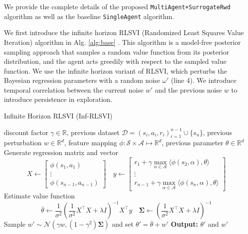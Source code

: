 We provide the complete details of the proposed \texttt{MultiAgent+SurrogateRwd} algorithm as well as the baseline \texttt{SingleAgent} algorithm.

We first introduce the infinite horizon RLSVI (Randomized Least Squares Value Iteration) algorithm in Alg. \ref{alg:base} \cite{russo2018tutorial}. This algorithm is a model-free posterior sampling approach that samples a random value function from its posterior distribution, and the agent acts greedily with respect to the sampled value function. We use the infinite horizon variant of RLSVI, which perturbs the Bayesian regression parameters with a random noise $\omega'$ (line 4). We introduce temporal correlation between the current noise $w'$ and the previous noise $w$ to introduce persistence in exploration.

\begin{algorithm}[H]
    \caption{Infinite Horizon RLSVI (Inf-RLSVI)}
        \begin{algorithmic}[1]
             discount factor $\gamma \in \mathbb{R}$, previous dataset $\mathcal{D} = (s_i, a_i, r_i)_{i = 1}^{n-1} \cup \{s_{n}\}$, previous perturbation $w \in \mathbb{R}^d$, feature mapping $\phi: \mathcal{S} \times \mathcal{A} \mapsto \mathbb{R}^d$, previous parameter $\theta \in \mathbb{R}^{d}$
            \STATE Generate regression matrix and vector
            $$
                X \leftarrow\left[\begin{array}{c}
                \phi\left(s_1, a_1\right) \\
                \vdots \\
                \phi\left(s_{n-1}, a_{n-1}\right)
                \end{array}\right] \quad y \leftarrow\left[\begin{array}{c}
                r_1+\gamma \max _{\alpha \in \mathcal{A}} \langle \phi(s_2, \alpha), \theta \rangle \\
                \vdots \\
                r_{n-1}+\gamma \max _{\alpha \in \mathcal{A}}\langle \phi(s_{n}, \alpha), \theta \rangle
                \end{array}\right]
            $$
            \STATE Estimate value function
            $$
                \bar{\theta} \leftarrow \frac{1}{\sigma^2}\left(\frac{1}{\sigma^2} X^{\top} X+\lambda I\right)^{-1} X^{\top} y \quad \mathbf{\Sigma} \leftarrow\left(\frac{1}{\sigma^2} X^{\top} X+\lambda I\right)^{-1}
            $$
            \STATE Sample $w' \sim \mathcal{N}(\gamma w, (1-\gamma^2) \mathbf{\Sigma})$ and set $\theta' = \bar \theta + w'$
            \STATE \textbf{Output:} $\theta'$ and $w'$
        \end{algorithmic}
        \label{alg:base}
\end{algorithm}

